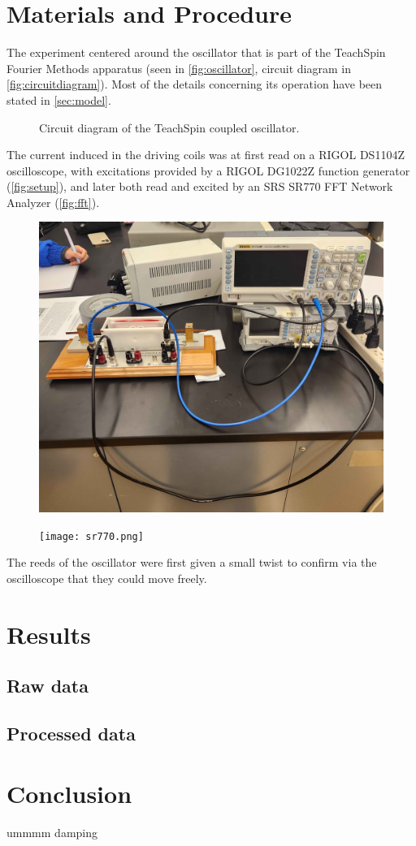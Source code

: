 \documentclass{article}
\begin{document}
\section{Materials and Procedure}
The experiment centered around the oscillator that is part of the TeachSpin Fourier Methods apparatus (seen in \autoref{fig:oscillator}, circuit diagram in \autoref{fig:circuitdiagram}). Most of the details concerning its operation have been stated in \autoref*{sec:model}.
\begin{figure}
    \centering
    \def\svgwidth{\linewidth}
    
    \caption{Circuit diagram of the TeachSpin coupled oscillator.}
    \label{fig:circuitdiagram}
\end{figure}
The current induced in the driving coils was at first read on a RIGOL DS1104Z oscilloscope, with excitations provided by a RIGOL DG1022Z function generator (\autoref{fig:setup}), and later both read and excited by an SRS SR770 FFT Network Analyzer (\autoref{fig:fft}).

\begin{figure}
    \centering
    \begin{minipage}{.5\textwidth}
        \centering
        \includegraphics[width=.8\linewidth]{setup.jpg}
        \label{fig:setup}
    \end{minipage}%
    \begin{minipage}{.5\textwidth}
        \centering
        \texttt{[image: sr770.png]}
        \label{fig:fft}
    \end{minipage}
\end{figure}

The reeds of the oscillator were first given a small twist to confirm via the oscilloscope that they could move freely.


\section{Results}
\subsection{Raw data}
\subsection{Processed data}

\section{Conclusion}
ummmm damping
\end{document}
